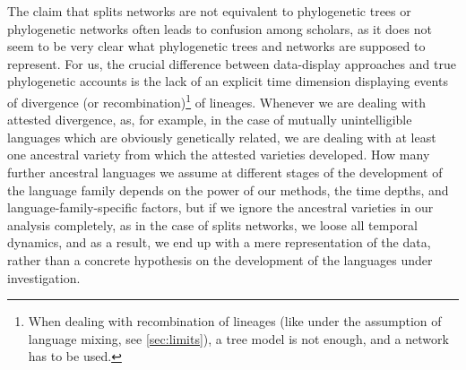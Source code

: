 \documentclass[svgnames,12pt]{scrartcl}
\begin{document}
{{The claim that splits networks are not equivalent to phylogenetic trees or phylogenetic networks
often leads to confusion among scholars, as it does not seem to be very clear what phylogenetic
trees and networks are supposed to represent. For us, the crucial difference between data-display
approaches and true phylogenetic accounts is the lack of an explicit time dimension displaying
events of divergence (or recombination)\footnote{When dealing with recombination of lineages (like
under the assumption of language mixing, see \ref{sec:limits}), a tree model is not enough, and a network
has to be used.} of lineages. Whenever we are dealing with attested divergence, as, for example, in
the case of mutually unintelligible languages which are obviously genetically related, we are
dealing with at least one ancestral variety from which the attested varieties developed. How many
further ancestral languages we assume at different stages of the development of the language family
depends on the power of our methods, the time depths, and language-family-specific factors, but if
we ignore the ancestral varieties in our analysis completely, as in the case of splits networks, we
loose all temporal dynamics, and as a result, we end up with a mere representation of the data,
rather than a concrete hypothesis on the development of the languages under investigation. 

}}
\end{document}
